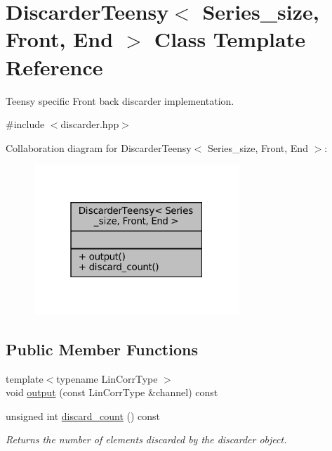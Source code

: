 \hypertarget{classDiscarderTeensy}{}\section{Discarder\+Teensy$<$ Series\+\_\+size, Front, End $>$ Class Template Reference}
\label{classDiscarderTeensy}


Teensy specific Front back discarder implementation.  




{\ttfamily \#include $<$discarder.\+hpp$>$}



Collaboration diagram for Discarder\+Teensy$<$ Series\+\_\+size, Front, End $>$\+:\nopagebreak
\begin{figure}[H]
\begin{center}
\leavevmode
\includegraphics[width=220pt]{d1/dd4/classDiscarderTeensy__coll__graph}
\end{center}
\end{figure}
\subsection*{Public Member Functions}
\begin{DoxyCompactItemize}
\item 
{\footnotesize template$<$typename Lin\+Corr\+Type $>$ }\\void \hyperlink{classDiscarderTeensy_ae7f8709724630ac3cc82a7a3ee202f2c}{output} (const Lin\+Corr\+Type \&channel) const
\item 
unsigned int \hyperlink{classDiscarderTeensy_acddeb78ebed208384b8ce100d9c503e6}{discard\+\_\+count} () const
\begin{DoxyCompactList}\small\item\em Returns the number of elements discarded by the discarder object. \end{DoxyCompactList}\end{DoxyCompactItemize}


